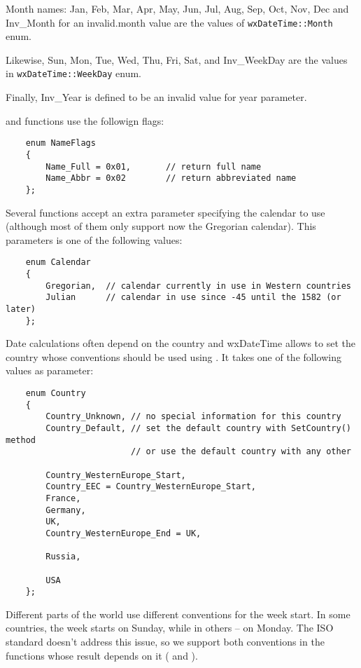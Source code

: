Month names: Jan, Feb, Mar, Apr, May, Jun, Jul, Aug, Sep, Oct, Nov, Dec and
Inv\_Month for an invalid.month value are the values of {\tt wxDateTime::Month}
enum.

Likewise, Sun, Mon, Tue, Wed, Thu, Fri, Sat, and Inv\_WeekDay are the values in
{\tt wxDateTime::WeekDay} enum.

Finally, Inv\_Year is defined to be an invalid value for year parameter.

 and
 functions use the followign
flags:

\begin{verbatim}
    enum NameFlags
    {
        Name_Full = 0x01,       // return full name
        Name_Abbr = 0x02        // return abbreviated name
    };
\end{verbatim}

Several functions accept an extra parameter specifying the calendar to use
(although most of them only support now the Gregorian calendar). This
parameters is one of the following values:

\begin{verbatim}
    enum Calendar
    {
        Gregorian,  // calendar currently in use in Western countries
        Julian      // calendar in use since -45 until the 1582 (or later)
    };
\end{verbatim}

Date calculations often depend on the country and wxDateTime allows to set the
country whose conventions should be used using 
. It takes one of the following
values as parameter:

\begin{verbatim}
    enum Country
    {
        Country_Unknown, // no special information for this country
        Country_Default, // set the default country with SetCountry() method
                         // or use the default country with any other

        Country_WesternEurope_Start,
        Country_EEC = Country_WesternEurope_Start,
        France,
        Germany,
        UK,
        Country_WesternEurope_End = UK,

        Russia,

        USA
    };
\end{verbatim}

Different parts of the world use different conventions for the week start.
In some countries, the week starts on Sunday, while in others -- on Monday.
The ISO standard doesn't address this issue, so we support both conventions in
the functions whose result depends on it ( and 
).

